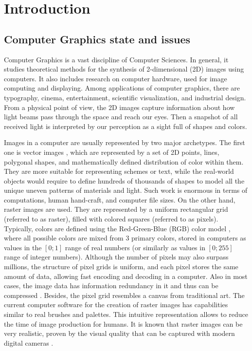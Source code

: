 \chapter{Introduction}\label{chapter:intro}

\section{Computer Graphics state and issues}\label{intro:cg}

Computer Graphics is a vast discipline of Computer Sciences. In general, it studies theoretical methods for the synthesis of 2-dimensional (2D) images using computers. It also includes research on computer hardware, used for image computing and displaying. Among applications of computer graphics, there are typography, cinema, entertainment, scientific visualization, and industrial design. From a physical point of view, the 2D images capture information about how light beams pass through the space and reach our eyes. Then a snapshot of all received light is interpreted by our perception as a sight full of shapes and colors. 

Images in a computer are usually represented by two major archetypes. The first one is vector images \cite{aux:vector14}, which are represented by a set of 2D points, lines, polygonal shapes, and mathematically defined distribution of color within them. They are more suitable for representing schemes or text, while the real-world objects would require to define hundreds of thousands of shapes to model all the unique uneven patterns of materials and light. Such work is enormous in terms of computations, human hand-craft, and computer file sizes. On the other hand, raster images \cite{aux:raster94} are used. They are represented by a uniform rectangular grid (referred to as raster), filled with colored squares (referred to as pixels). Typically, colors are defined using the Red-Green-Blue (RGB) color model \cite{aux:color05}, where all possible colors are mixed from 3 primary colors, stored in computers as values in the $[0;1]$ range of real numbers (or similarly as values in $[0;255]$ range of integer numbers). Although the number of pixels may also surpass millions, the structure of pixel grids is uniform, and each pixel stores the same amount of data, allowing fast encoding and decoding in a computer. Also in most cases, the image data has information redundancy in it and thus can be compressed \cite{aux:compression18}. Besides, the pixel grid resembles a canvas from traditional art. The current computer software for the creation of raster images has capabilities similar to real brushes and palettes. This intuitive representation allows to reduce the time of image production for humans. It is known that raster images can be very realistic, proven by the visual quality that can be captured with modern digital cameras \cite{aux:camera21}.


